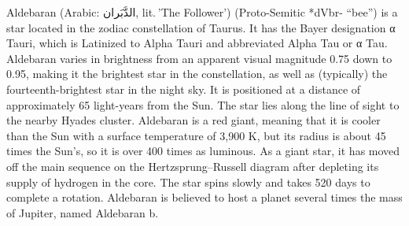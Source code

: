 Aldebaran (Arabic: الدَّبَران, lit. 'The Follower') (Proto-Semitic *dVbr- “bee”) is a star located in the zodiac constellation of Taurus. It has the Bayer designation α Tauri, which is Latinized to Alpha Tauri and abbreviated Alpha Tau or α Tau. Aldebaran varies in brightness from an apparent visual magnitude 0.75 down to 0.95, making it the brightest star in the constellation, as well as (typically) the fourteenth-brightest star in the night sky. It is positioned at a distance of approximately 65 light-years from the Sun. The star lies along the line of sight to the nearby Hyades cluster. Aldebaran is a red giant, meaning that it is cooler than the Sun with a surface temperature of 3,900 K, but its radius is about 45 times the Sun's, so it is over 400 times as luminous. As a giant star, it has moved off the main sequence on the Hertzsprung–Russell diagram after depleting its supply of hydrogen in the core. The star spins slowly and takes 520 days to complete a rotation. Aldebaran is believed to host a planet several times the mass of Jupiter, named Aldebaran b.
